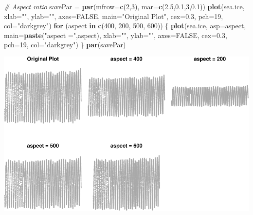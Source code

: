 \documentclass[9pt,letter]{article}
\newenvironment{Shaded}{\begin{snugshade}}{\end{snugshade}}
\newcommand{\KeywordTok}[1]{\textcolor[rgb]{0.13,0.29,0.53}{\textbf{#1}}}
\newcommand{\DataTypeTok}[1]{\textcolor[rgb]{0.13,0.29,0.53}{#1}}
\newcommand{\DecValTok}[1]{\textcolor[rgb]{0.00,0.00,0.81}{#1}}
\newcommand{\FloatTok}[1]{\textcolor[rgb]{0.00,0.00,0.81}{#1}}
\newcommand{\StringTok}[1]{\textcolor[rgb]{0.31,0.60,0.02}{#1}}
\newcommand{\CommentTok}[1]{\textcolor[rgb]{0.56,0.35,0.01}{\textit{#1}}}
\newcommand{\OtherTok}[1]{\textcolor[rgb]{0.56,0.35,0.01}{#1}}
\newcommand{\ControlFlowTok}[1]{\textcolor[rgb]{0.13,0.29,0.53}{\textbf{#1}}}
\newcommand{\NormalTok}[1]{#1}
\begin{document}
\begin{Shaded}
\begin{Highlighting}[]
\CommentTok{# Aspect ratio}
\NormalTok{savePar =}\StringTok{ }\KeywordTok{par}\NormalTok{(}\DataTypeTok{mfrow=}\KeywordTok{c}\NormalTok{(}\DecValTok{2}\NormalTok{,}\DecValTok{3}\NormalTok{), }\DataTypeTok{mar=}\KeywordTok{c}\NormalTok{(}\FloatTok{2.5}\NormalTok{,}\FloatTok{0.1}\NormalTok{,}\DecValTok{3}\NormalTok{,}\FloatTok{0.1}\NormalTok{))}
\KeywordTok{plot}\NormalTok{(sea.ice, }\DataTypeTok{xlab=}\StringTok{""}\NormalTok{, }\DataTypeTok{ylab=}\StringTok{""}\NormalTok{, }\DataTypeTok{axes=}\OtherTok{FALSE}\NormalTok{,}
     \DataTypeTok{main=}\StringTok{"Original Plot"}\NormalTok{, }\DataTypeTok{cex=}\FloatTok{0.3}\NormalTok{, }\DataTypeTok{pch=}\DecValTok{19}\NormalTok{, }\DataTypeTok{col=}\StringTok{"darkgrey"}\NormalTok{)}
\ControlFlowTok{for}\NormalTok{ (aspect }\ControlFlowTok{in} \KeywordTok{c}\NormalTok{(}\DecValTok{400}\NormalTok{, }\DecValTok{200}\NormalTok{, }\DecValTok{500}\NormalTok{, }\DecValTok{600}\NormalTok{)) \{}
  \KeywordTok{plot}\NormalTok{(sea.ice, }\DataTypeTok{asp=}\NormalTok{aspect,}
       \DataTypeTok{main=}\KeywordTok{paste}\NormalTok{(}\StringTok{"aspect ="}\NormalTok{,aspect),}
       \DataTypeTok{xlab=}\StringTok{""}\NormalTok{, }\DataTypeTok{ylab=}\StringTok{""}\NormalTok{, }\DataTypeTok{axes=}\OtherTok{FALSE}\NormalTok{,}
       \DataTypeTok{cex=}\FloatTok{0.3}\NormalTok{, }\DataTypeTok{pch=}\DecValTok{19}\NormalTok{, }\DataTypeTok{col=}\StringTok{"darkgrey"}\NormalTok{)}
\NormalTok{\}}
\KeywordTok{par}\NormalTok{(savePar)}
\end{Highlighting}
\end{Shaded}

\includegraphics{a4_solutions_files/figure-latex/unnamed-chunk-24-1.pdf}
\end{document}
